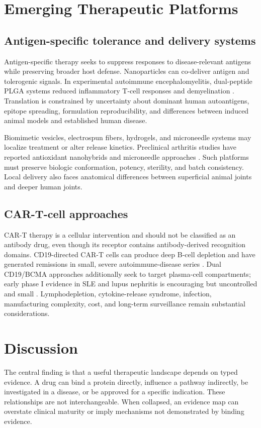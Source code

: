 \documentclass[12pt,a4paper]{article}
\begin{document}
\section{Emerging Therapeutic Platforms}
\subsection{Antigen-specific tolerance and delivery systems}
Antigen-specific therapy seeks to suppress responses to disease-relevant antigens while preserving broader host defense. Nanoparticles can co-deliver antigen and tolerogenic signals. In experimental autoimmune encephalomyelitis, dual-peptide PLGA systems reduced inflammatory T-cell responses and demyelination \cite{wang2022nano}. Translation is constrained by uncertainty about dominant human autoantigens, epitope spreading, formulation reproducibility, and differences between induced animal models and established human disease.

Biomimetic vesicles, electrospun fibers, hydrogels, and microneedle systems may localize treatment or alter release kinetics. Preclinical arthritis studies have reported antioxidant nanohybrids and microneedle approaches \cite{koo2023,xia2024}. Such platforms must preserve biologic conformation, potency, sterility, and batch consistency. Local delivery also faces anatomical differences between superficial animal joints and deeper human joints.

\subsection{CAR-T-cell approaches}
CAR-T therapy is a cellular intervention and should not be classified as an antibody drug, even though its receptor contains antibody-derived recognition domains. CD19-directed CAR-T cells can produce deep B-cell depletion and have generated remissions in small, severe autoimmune-disease series \cite{muller2024}. Dual CD19/BCMA approaches additionally seek to target plasma-cell compartments; early phase I evidence in SLE and lupus nephritis is encouraging but uncontrolled and small \cite{wang2024cart}. Lymphodepletion, cytokine-release syndrome, infection, manufacturing complexity, cost, and long-term surveillance remain substantial considerations.

\section{Discussion}
The central finding is that a useful therapeutic landscape depends on typed evidence. A drug can bind a protein directly, influence a pathway indirectly, be investigated in a disease, or be approved for a specific indication. These relationships are not interchangeable. When collapsed, an evidence map can overstate clinical maturity or imply mechanisms not demonstrated by binding evidence.
\end{document}
